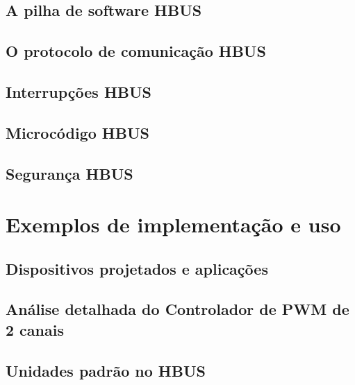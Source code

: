 \documentclass[11pt]{report}
\begin{document}
\chapter{A pilha de software HBUS}



\chapter{O protocolo de comunicação HBUS}



\chapter{Interrupções HBUS}



\chapter{Microcódigo HBUS}



\chapter{Segurança HBUS}



\part{Exemplos de implementação e uso}

\chapter{Dispositivos projetados e aplicações}



\chapter{Análise detalhada do Controlador de PWM de 2 canais}



\appendix
\chapter{Unidades padrão no HBUS}


\end{document}
